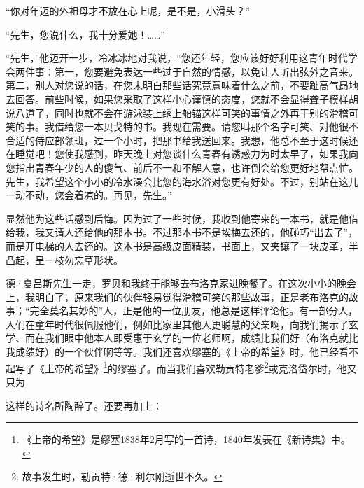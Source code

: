 \par “你对年迈的外祖母才不放在心上呢，是不是，小滑头？”
\par “先生，您说什么，我十分爱她！……”
\par “先生，”他迈开一步，冷冰冰地对我说，“您还年轻，您应该好好利用这青年时代学会两件事：第一，您要避免表达一些过于自然的情感，以免让人听出弦外之音来。第二，别人对您说的话，在您未明白那些话究竟意味着什么之前，不要趾高气昂地去回答。前些时候，如果您采取了这样小心谨慎的态度，您就不会显得聋子模样胡说八道了，同时也就不会在游泳装上绣上船锚这样可笑的事情之外再干别的滑稽可笑的事。我借给您一本贝戈特的书。我现在需要。请您叫那个名字可笑、对他很不合适的侍应部领班，过一个小时，把那书给我送回来。我想，他总不至于这时候还在睡觉吧！您使我感到，昨天晚上对您谈什么青春有诱惑力为时太早了，如果我向您指出青春年少的人的傻气、前后不一和不解人意，也许倒会给您更好地帮点忙。先生，我希望这个小小的冷水澡会比您的海水浴对您更有好处。不过，别站在这儿一动不动，您会着凉的。再见，先生。”
\par 显然他为这些话感到后悔。因为过了一些时候，我收到他寄来的一本书，就是他借给我，我又请人还给他的那本书。不过那本书不是埃梅去还的，他碰巧“出去了”，而是开电梯的人去还的。这本书是高级皮面精装，书面上，又夹镶了一块皮革，半凸起，呈一枝勿忘草形状。
\par 德·夏吕斯先生一走，罗贝和我终于能够去布洛克家进晚餐了。在这次小小的晚会上，我明白了，原来我们的伙伴轻易觉得滑稽可笑的那些故事，正是老布洛克的故事；“完全莫名其妙的”人，正是他的一位朋友，他总是这样评论他。有一部分人，人们在童年时代很佩服他们，例如比家里其他人更聪慧的父亲啊，向我们揭示了玄学、而在我们眼中他本人即受惠于玄学的一位老师啊，成绩比我们好（布洛克就比我成绩好）的一个伙伴啊等等。我们还喜欢缪塞的《上帝的希望》时，他已经看不起写了《上帝的希望》\footnote{《上帝的希望》是缪塞1838年2月写的一首诗，1840年发表在《新诗集》中。}的缪塞了。而当我们喜欢勒贡特老爹\footnote{故事发生时，勒贡特·德·利尔刚逝世不久。}或克洛岱尔时，他又只为
\par 这样的诗名所陶醉了。还要再加上：
